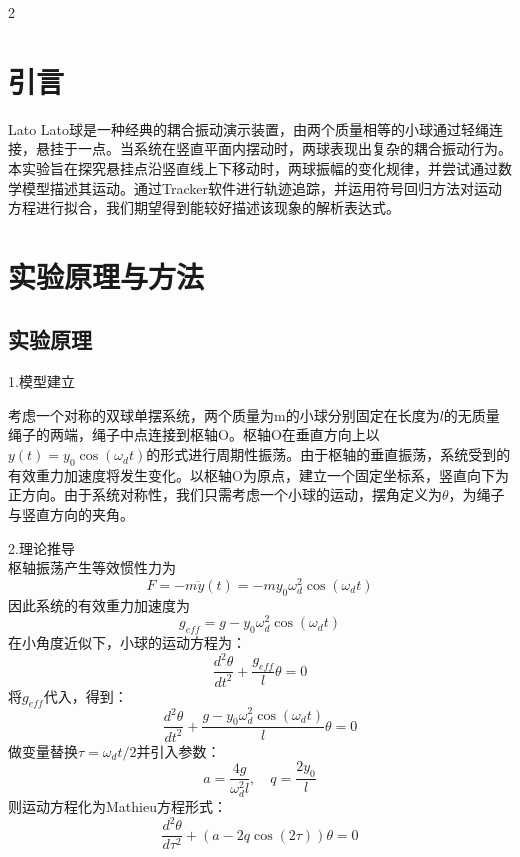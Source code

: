 \documentclass[12pt,a4paper]{article}
\begin{document}
\begin{multicols}{2}

    \section*{\heiti 引言}
    \songti
    \setlength{\parindent}{2em}
    Lato Lato球是一种经典的耦合振动演示装置，由两个质量相等的小球通过轻绳连接，悬挂于一点。当系统在竖直平面内摆动时，两球表现出复杂的耦合振动行为。本实验旨在探究悬挂点沿竖直线上下移动时，两球振幅的变化规律，并尝试通过数学模型描述其运动。通过Tracker软件进行轨迹追踪，并运用符号回归方法对运动方程进行拟合，我们期望得到能较好描述该现象的解析表达式。

    \section{\heiti 实验原理与方法}
    \subsection{\heiti 实验原理}
    \songti
    \noindent 1.模型建立
    
    考虑一个对称的双球单摆系统，两个质量为m的小球分别固定在长度为$l$的无质量绳子的两端，绳子中点连接到枢轴O。枢轴O在垂直方向上以$y(t)=y_0\cos(\omega_d t)$的形式进行周期性振荡。由于枢轴的垂直振荡，系统受到的有效重力加速度将发生变化。以枢轴O为原点，建立一个固定坐标系，竖直向下为正方向。由于系统对称性，我们只需考虑一个小球的运动，摆角定义为$\theta$，为绳子与竖直方向的夹角。

    \noindent 2.理论推导\\
    枢轴振荡产生等效惯性力为\begin{equation}
    F=-m\ddot{y}(t)=-my_0\omega_d^2\cos(\omega_d t)
    \end{equation}
    因此系统的有效重力加速度为\begin{equation}
    g_{eff}=g-y_0\omega_d^2\cos(\omega_d t)
    \end{equation}
    在小角度近似下，小球的运动方程为：
    \begin{equation}
        \frac{d^2\theta}{dt^2} + \frac{g_{eff}}{l}\theta = 0
    \end{equation}
    将$g_{eff}$代入，得到：
    \begin{equation}
        \frac{d^2\theta}{dt^2} + \frac{g - y_0\omega_d^2\cos(\omega_d t)}{l}\theta = 0
    \end{equation}
    做变量替换$\tau = \omega_d t/2$并引入参数：
    \begin{equation}
        a = \frac{4g}{\omega_d^2 l}, \quad q = \frac{2y_0}{l}
    \end{equation}
    则运动方程化为Mathieu方程形式：
    \begin{equation}
        \frac{d^2\theta}{d\tau^2} + \left(a - 2q\cos(2\tau)\right)\theta = 0
    \end{equation}


\end{multicols}
\end{document}

